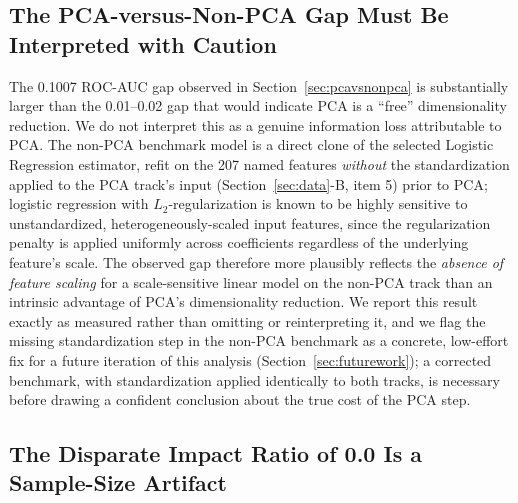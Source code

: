 \documentclass[journal]{IEEEtran}
\begin{document}
\subsection{The PCA-versus-Non-PCA Gap Must Be Interpreted with Caution}

The 0.1007 ROC-AUC gap observed in Section~\ref{sec:pcavsnonpca} is substantially larger than the 0.01--0.02 gap that would indicate PCA is a ``free'' dimensionality reduction. We do not interpret this as a genuine information loss attributable to PCA. The non-PCA benchmark model is a direct clone of the selected Logistic Regression estimator, refit on the 207 named features \emph{without} the standardization applied to the PCA track's input (Section~\ref{sec:data}-B, item 5) prior to PCA; logistic regression with $L_2$-regularization is known to be highly sensitive to unstandardized, heterogeneously-scaled input features, since the regularization penalty is applied uniformly across coefficients regardless of the underlying feature's scale. The observed gap therefore more plausibly reflects the \emph{absence of feature scaling} for a scale-sensitive linear model on the non-PCA track than an intrinsic advantage of PCA's dimensionality reduction. We report this result exactly as measured rather than omitting or reinterpreting it, and we flag the missing standardization step in the non-PCA benchmark as a concrete, low-effort fix for a future iteration of this analysis (Section~\ref{sec:futurework}); a corrected benchmark, with standardization applied identically to both tracks, is necessary before drawing a confident conclusion about the true cost of the PCA step.

\subsection{The Disparate Impact Ratio of 0.0 Is a Sample-Size Artifact}
\end{document}
